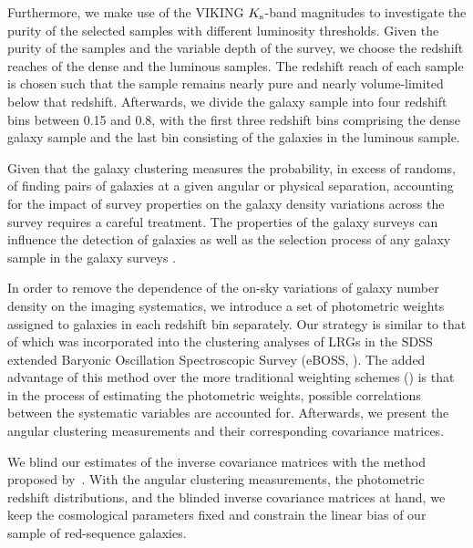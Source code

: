 \documentclass[fleqn,usenatbib,useAMS]{mnras}
\begin{document}
Furthermore, we make use of the VIKING $K_{\rm s}$-band magnitudes to investigate the purity of the selected samples with different luminosity thresholds. Given the purity of the samples and the variable depth of the survey, we choose the redshift reaches of the dense and the luminous samples. The redshift reach of each sample is chosen such that the sample remains nearly pure and nearly volume-limited below that redshift. Afterwards, we divide the galaxy sample into four redshift bins between 0.15 and 0.8, with the first three redshift bins comprising the dense galaxy sample and the last bin consisting of the galaxies in the luminous sample. 

Given that the galaxy clustering measures the probability, in excess of randoms, of finding pairs of galaxies at a given angular or physical separation, accounting for the impact of survey properties on the galaxy density variations across the survey requires a careful treatment. The properties of the galaxy surveys can influence the detection of galaxies as well as the selection process of any galaxy sample in the galaxy surveys \citep[e.g.][]{alam2017,kwan2017,ross2017,elvin2017,crocce2019,kalus2019}. 


In order to remove the dependence of the on-sky variations of galaxy number density on the imaging systematics, we introduce a set of photometric weights assigned to galaxies in each redshift bin separately. Our strategy is similar to that of \citet{bautista2018sdss, icaza2020clustering} which was incorporated into the clustering analyses of LRGs in the SDSS extended Baryonic Oscillation Spectroscopic Survey (eBOSS, \citealt{dawson2016}). The added advantage of this method over the more traditional weighting schemes (\citealt{ross2017clustering, crocce2019dark}) is that in the process of estimating the photometric weights, possible correlations between the systematic variables are accounted for. Afterwards, we present the angular clustering measurements and their corresponding covariance matrices.

We blind our estimates of the inverse covariance matrices with the method proposed by~\citet{sellentin2019}. With the angular clustering measurements, the photometric redshift distributions, and the blinded inverse covariance matrices at hand, we keep the cosmological parameters fixed and constrain the linear bias of our sample of red-sequence galaxies. 
\end{document}
